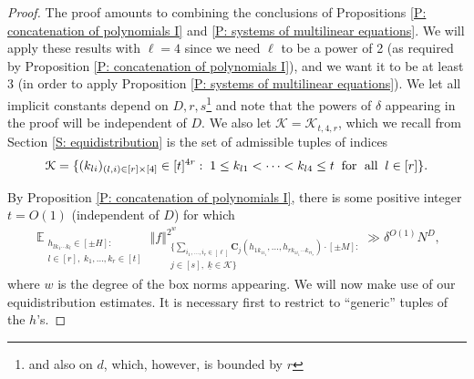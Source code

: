 \documentclass[11pt]{amsart}
\theoremstyle{definition}
\DeclareMathOperator*{\E}{\mathbb{E}}
\newcommand{\CK}{{\mathcal K}}
\newcommand{\bc}{{\textbf{C}}}
\newcommand{\uk}{{\underline{k}}}
\newcommand{\norm}[1]{\left\Vert #1\right\Vert}
\begin{document}
\begin{proof}
The proof amounts to combining the conclusions of Propositions \ref{P: concatenation of polynomials I} and \ref{P: systems of multilinear equations}. We will apply these results with $\ell = 4$ since we need $\ell$ to be a power of 2 (as required by Proposition \ref{P: concatenation of polynomials I}), and we want it to be at least 3 (in order to apply Proposition  \ref{P: systems of multilinear equations}). We let all implicit constants depend on $D, r, s$\footnote{and also on $d$, which, however, is bounded by $r$} and note that the powers of $\delta$ appearing in the proof will be independent of $D$. We also let $\CK = \CK_{t, 4, r}$, which we recall from Section \ref{S: equidistribution} is the set of admissible tuples of indices
    \begin{align*}
        \CK = \{(k_{li})_{\substack{(l,i)\in[r]\times[4]}}\in[t]^{4r}:\; 1\leq k_{l1}<\cdots < k_{l4}\leq t\;\; \textrm{for\; all}\;\; l\in[r]\}.
    \end{align*}

By Proposition \ref{P: concatenation of polynomials I}, there is some positive integer $t=O(1)$ (independent of $D$) for which
    \begin{align}\label{E: unsmoothedconcatenated}
        \E_{\substack{h_{lk_1\cdots k_l}\in[\pm H]:\\ l\in[r],\; k_1, \ldots, k_r\in[t]}}
        \norm{f}_{\substack{\{\sum\limits_{i_1, \ldots, i_r\in[\ell]}\bc_j(h_{1k_{1i_1}}, \ldots, h_{rk_{1i_1}\cdots k_{ri_r}})\cdot[\pm M]:\\ j\in[s],\;
        \uk\in\CK\}}}^{2^{w}} \gg \delta^{O(1)} N^D,
    \end{align}
    where $w$ is the degree of the box norms appearing.  We will now make use of our equidistribution estimates.  It is necessary first to restrict to ``generic'' tuples of the $h$'s.


\end{proof}
\end{document}
